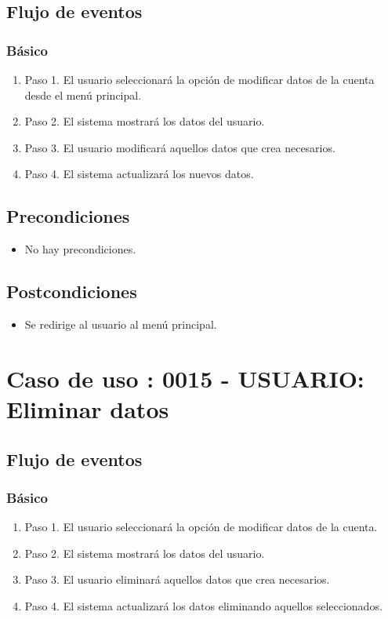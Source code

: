 \subsection{Flujo de eventos}
\subsubsection{Básico}

\begin{enumerate}
\item Paso 1.
El usuario seleccionará la opción de modificar datos de la cuenta desde el menú principal.
\item Paso 2.
El sistema mostrará los datos del usuario.
\item Paso 3.
El usuario modificará aquellos datos que crea necesarios.
\item Paso 4.
El sistema actualizará los nuevos datos.
\end{enumerate}

\subsection{Precondiciones}
\begin{itemize}
\item No hay precondiciones.
\end{itemize}

\subsection{Postcondiciones}
\begin{itemize}
\item Se redirige al usuario al menú principal.
\end{itemize}



\section{Caso de uso : 0015 - USUARIO: Eliminar datos}\label{sec:uc0}
\subsection{Flujo de eventos}
\subsubsection{Básico}

\begin{enumerate}
\item Paso 1.
El usuario seleccionará la opción de modificar datos de la cuenta.
\item Paso 2.
El sistema mostrará los datos del usuario.
\item Paso 3.
El usuario eliminará aquellos datos que crea necesarios.
\item Paso 4.
El sistema actualizará los datos eliminando aquellos seleccionados.
\end{enumerate}

